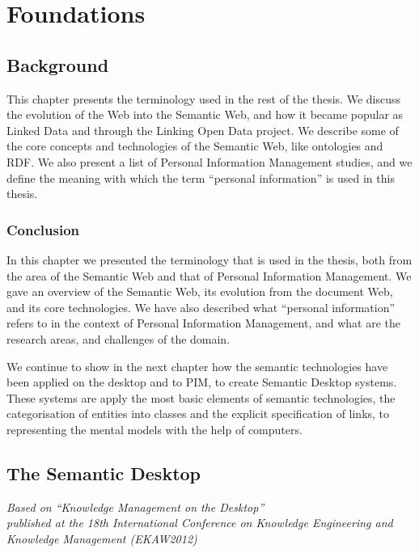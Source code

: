 \part{Foundations}
\label{part:background}

\chapter{Background}
\label{ch:background}

This chapter presents the terminology used in the rest of the thesis. We discuss the evolution of the Web into the Semantic Web, and how it became popular as Linked Data and through the Linking Open Data project. We describe some of the core concepts and technologies of the Semantic Web, like ontologies and RDF. We also present a list of Personal Information Management studies, and we define the meaning with which the term ``personal information'' is used in this thesis.





\section{Conclusion}

In this chapter we presented the terminology that is used in the thesis, both from the area of the Semantic Web and that of Personal Information Management. We gave an overview of the Semantic Web, its evolution from the document Web, and its core technologies. 
We have also described what ``personal information'' refers to in the context of Personal Information Management, and what are the research areas, and challenges of the domain. 

We continue to show in the next chapter how the semantic technologies have been applied on the desktop and to PIM, to create Semantic Desktop systems. These systems are apply the most basic elements of semantic technologies, the categorisation of entities into classes and the explicit specification of links, to representing the mental models with the help of computers. 

\chapter{The Semantic Desktop}
\label{ch:sd}

\begin{flushright}
 \textit{Based on ``Knowledge Management on the Desktop'' \cite{Dragan2012}\\published at the 18th International Conference on Knowledge Engineering and Knowledge Management (EKAW2012)}
\end{flushright}

